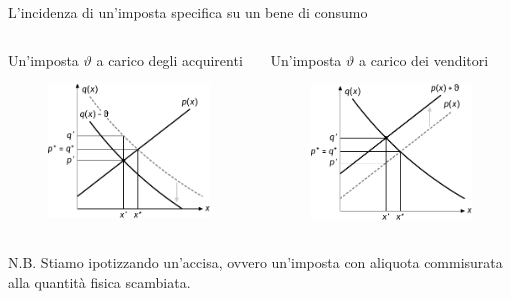 \documentclass[11pt]{beamer}
\begin{document}
\begin{frame}{L'incidenza di un'imposta specifica su un bene di consumo}
\begin{columns}
\begin{column}{.5\columnwidth}
Un'imposta $\vartheta$ a carico degli acquirenti

\begin{figure}[htbp]
\centering
\includegraphics[width=\textwidth]{./figure/incidenza-2.pdf}
\end{figure}
\end{column}

\begin{column}{.5\columnwidth}
Un'imposta $\vartheta$ a carico dei venditori

\begin{figure}[htbp]
\centering
\includegraphics[width=\textwidth]{./figure/incidenza-3.pdf}
\end{figure}
\end{column}
\end{columns}

N.B. Stiamo ipotizzando un'accisa, ovvero un'imposta con aliquota commisurata alla quantità fisica scambiata.
\end{frame}
\end{document}
